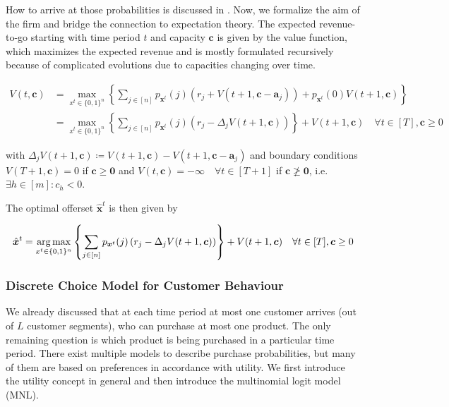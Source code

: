 How to arrive at those probabilities is discussed in . Now, we formalize the aim of the firm and bridge the connection to expectation theory. The expected revenue-to-go starting with time period $t$ and capacity $\boldsymbol{c}$ is given by the value function, which maximizes the expected revenue and is mostly formulated recursively because of complicated evolutions due to capacities changing over time.


\begin{align}
V(t, \boldsymbol{c}) &= \max_{x^t \in \{0,1\}^n}\left\{ \sum_{j \in [n]} p_{\boldsymbol{x}^t}(j) \left( r_j + V(t+1, \boldsymbol{c} - \boldsymbol{a}_j) \right) + p_{\boldsymbol{x}^t}(0) V(t+1, \boldsymbol{c}) \right\} \label{eq:Bellman}\\
&= \max_{x^t \in \{0,1\}^n}\left\{ \sum_{j \in [n]} p_{\boldsymbol{x}^t}(j) \left( r_j - \Delta_j V(t+1, \boldsymbol{c}) \right) \right\} + V(t+1, \boldsymbol{c})\quad \forall t \in [T], \boldsymbol{c} \geq 0
\end{align}

with $\Delta_j V(t+1, \boldsymbol{c}) \coloneqq V(t+1, \boldsymbol{c}) - V(t+1, \boldsymbol{c} - \boldsymbol{a}_j)$ and boundary conditions $V(T+1, \boldsymbol{c}) = 0$ if $\boldsymbol{c} \geq \boldsymbol{0}$ and $V(t, \boldsymbol{c}) = - \infty \quad \forall t \in [T+1]$ if $\boldsymbol{c} \ngeq \boldsymbol{0}$, i.e. $\exists h \in [m]: c_h < 0$.

The optimal offerset $\hat{\boldsymbol{x}}^t$ is then given by

\begin{align}
\hat{\boldsymbol{x}}^t = \operatorname*{arg\,max}_{x^t \in \{0,1\}^n}\left\{ \sum_{j \in [n]} p_{\boldsymbol{x}^t}(j) \left( r_j - \Delta_j V(t+1, \boldsymbol{c}) \right) \right\} + V(t+1, \boldsymbol{c})\quad \forall t \in [T], \boldsymbol{c} \geq 0\label{eq:DP-optOffer}
\end{align}


\subsubsection{Discrete Choice Model for Customer Behaviour}\label{sss:DCM}


We already discussed that at each time period at most one customer arrives (out of $L$ customer segments), who can purchase at most one product. The only remaining question is which product is being purchased in a particular time period. There exist multiple models to describe purchase probabilities, but many of them are based on preferences in accordance with utility. We first introduce the utility concept in general and then introduce the multinomial logit model (MNL).

